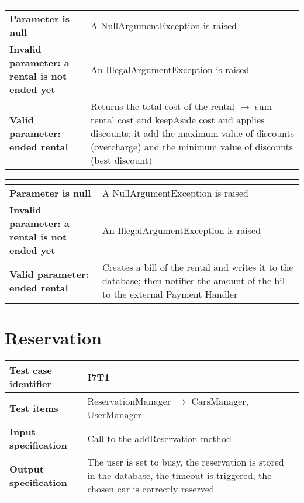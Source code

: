 \documentclass{scrreprt}
\begin{document}
\begin{center}
\begin{tabularx}{\columnwidth}{>{\bfseries}XX}
\toprule
\multicolumn{2}{>{\bfseries}c}{\textit{PaymentManager $\longrightarrow$  computeTotalPrice(rental)}}\\
\toprule

Parameter is null & A NullArgumentException is raised\\
\midrule
Invalid parameter: a rental is not ended yet & An IllegalArgumentException is raised\\
\midrule
Valid parameter: ended rental & Returns the total cost of the rental $\longrightarrow$ sum rental cost and keepAside cost and applies discounts: it add the maximum value of discounts (overcharge) and the minimum value of discounts (best discount)\\

\bottomrule
\end{tabularx}
\end{center}

\begin{center}
\begin{tabularx}{\columnwidth}{>{\bfseries}XX}
\toprule
\multicolumn{2}{>{\bfseries}c}{\textit{PaymentManager $\longrightarrow$  addBill(rental)}}\\
\toprule
Parameter is null & A NullArgumentException is raised\\
\midrule
Invalid parameter: a rental is not ended yet & An IllegalArgumentException is raised \\
\midrule
Valid parameter: ended rental & Creates a bill of the rental and writes it to the database; then notifies the amount of the bill to the external Payment Handler\\
\bottomrule
\end{tabularx}
\end{center}

\section{Reservation}

\begin{center}
\begin{tabularx}{\columnwidth}{>{\bfseries}lX}
\toprule
Test case identifier & I7T1\\
\midrule
Test items & ReservationManager $\longrightarrow$ CarsManager, UserManager\\
\midrule
Input specification & Call to the addReservation method\\
\midrule
Output specification & The user is set to busy, the reservation is stored in the database, the timeout is triggered, the chosen car is correctly reserved\\

\bottomrule
\end{tabularx}
\end{center}
\end{document}
